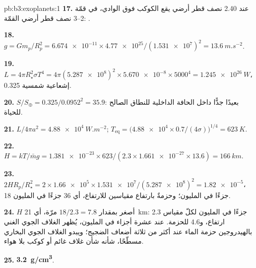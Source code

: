 \begin{solution}{pb:b3:exoplanets:1}
\textbf{17.} عند 2.40 نصف قطر أرضي يقع الكوكب فوق الوادي، في قمّة 2--3 نصف قطر أرضي
القمّة: .

\textbf{18.} $g = Gm_p/R_p^2 = \num{6.674e-11}\times\num{4.77e25}/(\num{1.531e7})^2 =
\qty{13.6}{m.s^{-2}}$.

\textbf{19.} $L = 4\pi R_\star^2\sigma T^4 = 4\pi(\num{5.287e8})^2\times\num{5.670e-8}
\times5000^4 = \qty{1.245e26}{W}$، 0.325 إشعاعية شمسية.

\textbf{20.} $S/S_\oplus = 0.325/0.0952^2 = 35.9$: بعيدًا جدًّا داخل الحافة الداخلية
للنطاق الصالح للحياة.

\textbf{21.} $L/4\pi a^2 = \qty{4.88e4}{W.m^{-2}}$; $T_\mathrm{eq} =
\bigl(\num{4.88e4}\times0.7/(4\sigma)\bigr)^{1/4} = \qty{623}{K}$.

\textbf{22.} $H = kT/\bar m g = \num{1.381e-23}\times623/(2.3\times\num{1.661e-27}
\times13.6) = \qty{166}{km}$.

\textbf{23.} $2HR_p/R_\star^2 = 2\times\num{1.66e5}\times\num{1.531e7}/
(\num{5.287e8})^2 = \num{1.82e-5}$، 18 جزءًا في المليون؛ وحزمةٌ بارتفاع
مقياسين للارتفاع، أي 36 جزءًا في المليون.

\textbf{24.} $H$ أصغر بمقدار $18/2.3 = 7.8$ مرّة، أي \qty{21}{km}: 2.3 جزءًا في
المليون لكلّ مقياس ارتفاع، و4.6 للحزمة. عند عشرة أجزاء في المليون، يُظهر الغلاف الجوي الغني بالهيدروجين
حزمة الماء عند أكثر من ثلاثة أضعاف
الضجيج؛ ويبدو الغلاف الجوي البخاري مسطّحًا، شأنه شأن غلاف غائم أو كوكب
بلا هواء.

\textbf{25.} \textbf{\qty[text-series-to-math=true]{3.2}{g/cm^3}}.
\end{solution}
